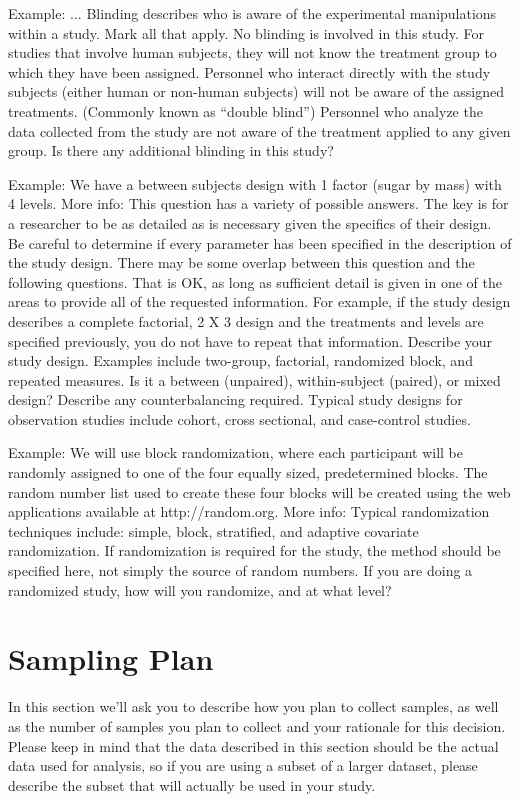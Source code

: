 \documentclass[highlight, explanations]{prereg}
\begin{document}
{Example: ...}
{Blinding describes who is aware of the experimental manipulations within a study. Mark all that apply.
No blinding is involved in this study.
For studies that involve human subjects, they will not know the treatment group to which they have been assigned.
Personnel who interact directly with the study subjects (either human or non-human subjects) will not be aware of the assigned treatments. (Commonly known as “double blind”)
Personnel who analyze the data collected from the study are not aware of the treatment applied to any given group.
Is there any additional blinding in this study?
}

{Example: We have a between subjects design with 1 factor (sugar by mass) with 4 levels. 
More info: This question has a variety of possible answers. The key is for a researcher to be as detailed as is necessary given the specifics of their design. Be careful to determine if every parameter has been specified in the description of the study design. There may be some overlap between this question and the following questions. That is OK, as long as sufficient detail is given in one of the areas to provide all of the requested information. For example, if the study design describes a complete factorial, 2 X 3 design and the treatments and levels are specified previously, you do not have to repeat that information.}
{Describe your study design. Examples include two-group, factorial, randomized block, and repeated measures. Is it a between (unpaired), within-subject (paired), or mixed design? Describe any counterbalancing required. Typical study designs for observation studies include cohort, cross sectional, and case-control studies.
}

{Example: We will use block randomization, where each participant will be randomly assigned to one of the four equally sized, predetermined blocks. The random number list used to create these four blocks will be created using the web applications available at http://random.org. 
More info: Typical randomization techniques include: simple, block, stratified, and adaptive covariate randomization. If randomization is required for the study, the method should be specified here, not simply the source of random numbers.}
{If you are doing a randomized study, how will you randomize, and at what level?
}

\section{Sampling Plan}
In this section we’ll ask you to describe how you plan to collect samples, as well as the number of samples you plan to collect and your rationale for this decision. Please keep in mind that the data described in this section should be the actual data used for analysis, so if you are using a subset of a larger dataset, please describe the subset that will actually be used in your study.
\end{document}
